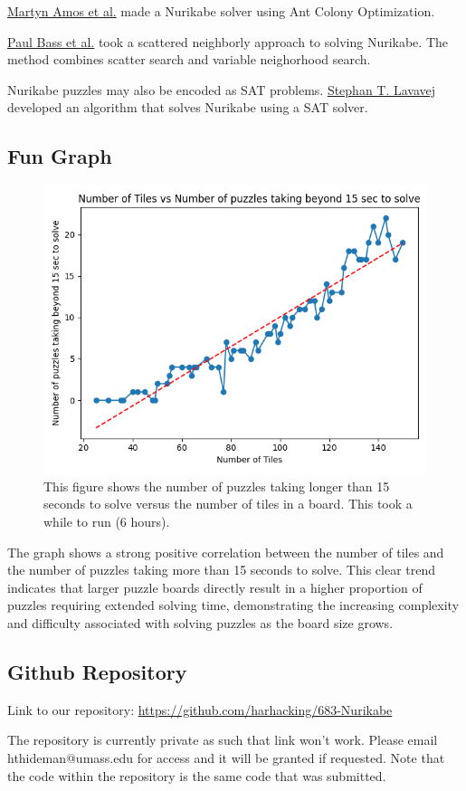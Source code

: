 \documentclass{article}
\theoremstyle{definition}
\begin{document}
\hyperlink{https://dl.acm.org/doi/10.1145/3319619.3338470}{Martyn Amos et al.} \cite{Amos} made a Nurikabe solver using Ant Colony Optimization. 

\hyperlink{https://dl.acm.org/doi/pdf/10.5555/3447286.3447294}{Paul Bass et al.} \cite{Bass} took a scattered neighborly approach to solving Nurikabe. The method combines scatter search and variable neighorhood search. 

Nurikabe puzzles may also be encoded as SAT problems. \hyperlink{https://github.com/Microsoft/nurikabe}{Stephan T. Lavavej} \cite{Lavavej} developed an algorithm that solves Nurikabe using a SAT solver.

\subsection{Fun Graph}
\begin{figure}[H]
    \centering
    \includegraphics[width=0.7\linewidth]{num_tiles_vs_timeouts.png}
    \caption{This figure shows the number of puzzles taking longer than 15 seconds to solve versus the number of tiles in a board. This took a while to run (6 hours).}
\end{figure}
The graph shows a strong positive correlation between the number of tiles and the number of puzzles taking more than 15 seconds to solve. This clear trend indicates that larger puzzle boards directly result in a higher proportion of puzzles requiring extended solving time, demonstrating the increasing complexity and difficulty associated with solving puzzles as the board size grows.

\subsection{Github Repository}
Link to our repository:
\hyperlink{https://github.com/harhacking/683-Nurikabe}{https://github.com/harhacking/683-Nurikabe}

The repository is currently private as such that link won't work. Please email hthideman@umass.edu for access and it will be granted if requested. Note that the code within the repository is the same code that was submitted.
\end{document}
